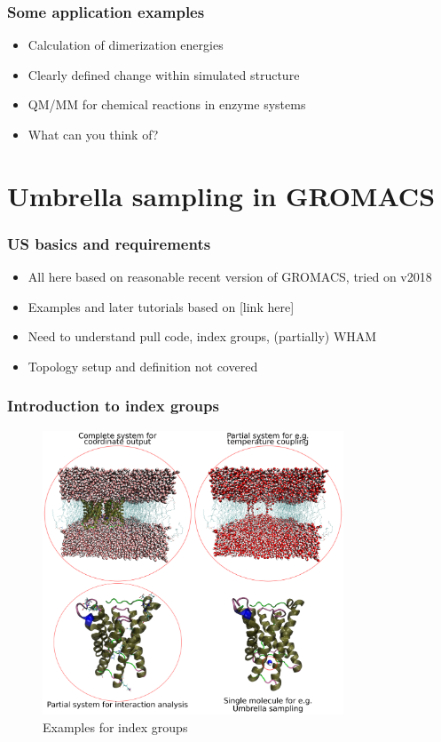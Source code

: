 \documentclass{beamer}
\numberwithin{table}{section}
\numberwithin{figure}{section}
\numberwithin{equation}{section}
\begin{document}
\begin{frame}
\frametitle{Some application examples}
    \begin{itemize}
        \item{Calculation of dimerization energies}
        \item{Clearly defined change within simulated structure}
        \item{QM/MM for chemical reactions in enzyme systems}
        \item{What can you think of?}
    \end{itemize}
\end{frame}

\section{Umbrella sampling in GROMACS}

\begin{frame}
\frametitle{US basics and requirements}
    \begin{itemize}
        \item{All here based on reasonable recent version of GROMACS, tried on v2018}
        \item{Examples and later tutorials based on [link here]}
        \item{Need to understand pull code, index groups, (partially) WHAM}
        \item{Topology setup and definition not covered}
    \end{itemize}
\end{frame}

\begin{frame}
\frametitle{Introduction to index groups}
    \begin{figure}[htb]
        \centering
        \includegraphics[keepaspectratio=true, width=0.8\textwidth]{figures/index-groups.pdf}
        \caption{Examples for index groups}
    \end{figure}
\end{frame}
\end{document}
